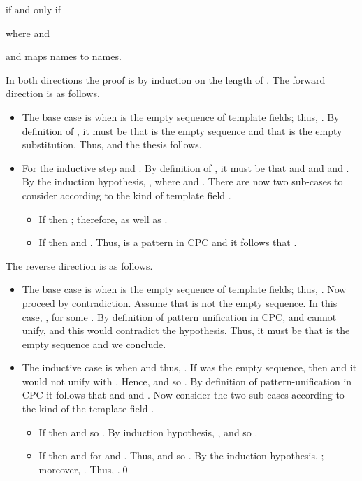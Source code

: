 \documentclass{LMCS}
\begin{document}
\begin{lem}
\label{lem:twomatchs}
 if and only if 

where  and
 
and  maps names to names. 
\end{lem}
\proof
In both directions the proof is by induction on the length of .
The forward direction is as follows.
\begin{itemize}
	\item The base case is when  is the empty sequence of template fields;
				thus, .
				By definition of , it must be that  is the empty sequence
				and that  is the empty substitution.
				Thus,  and the thesis follows.
	\item For the inductive step  and .
				By definition of , it must be that  and  and
				 and .
				By the induction hypothesis, ,
				where 
				and .
				There are now two sub-cases to consider according to the kind of template field .
				\begin{itemize}
					\item If  then ; therefore,
								 as well as
								.
					\item If  then  and .
								Thus,  is a pattern in CPC and it follows that
								.
				\end{itemize}
\end{itemize}
The reverse direction is as follows.
\begin{itemize}
	\item The base case is when  is the empty sequence of template fields;
				thus, .
				Now proceed by contradiction.
				Assume that  is not the empty sequence.
				In this case, ,
				for some .
				By definition of pattern unification in CPC,  and  cannot unify,
				and this would contradict the hypothesis. Thus, it must be that  is the empty sequence
				and we conclude.
	\item The inductive case is when  and thus,
				.
				If  was the empty sequence, then
				 and it would not unify with .
 				Hence,  and so
 				.
 				By definition of pattern-unification in CPC it follows that
 				 and
					and .
				Now consider the two sub-cases according to the kind of the template field .
				\begin{itemize}
					\item If  then  and so .
								By induction hypothesis, ,
								and so .
					\item If  then  and
								 for 
								and .
								Thus,  and so .
								By the induction hypothesis, ;
								moreover, .
								Thus, .\qed
				\end{itemize}
\end{itemize}
\end{document}
